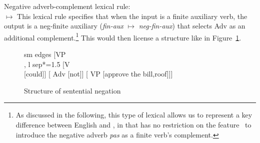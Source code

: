\documentclass[output=paper
	        ,collection
	        ,collectionchapter
 	        ,biblatex
                ,babelshorthands
                ,newtxmath
                ,draftmode
                ,colorlinks, citecolor=brown
]{langscibook}
\begin{document}
\begin{exe}
\begin{xlist}
\begin{exe}
\begin{xlist}
\ea
Negative adverb-complement lexical rule:\\
 $\mapsto$
\z
%
This lexical rule specifies that when the input is a finite auxiliary verb,
the output is a neg-finite auxiliary (\textit{fin-aux} $\mapsto$ \textit{neg-fin-aux})
that selects Adv as an additional complement.\footnote{As
discussed in the following, this type of lexical allows us
to represent a key difference between English and , in that
 has no restriction on the feature \AUX\ to introduce the negative
adverb {\it pas}
as a finite verb's complement.}  This would then
license a structure like in Figure~\ref{negation-fig:6}.


\begin{figure}
	\begin{forest}
		sm edges
		[VP\\
		, l sep*=1.5
			[V\\
				[could]]
			[ Adv
				[not]]
			[ VP
				[approve the bill,roof]]]
	\end{forest}
\caption{Structure of sentential negation}\label{negation-fig:6}
\end{figure}


\end{xlist}
\end{exe}
\end{xlist}
\end{exe}
\end{document}
